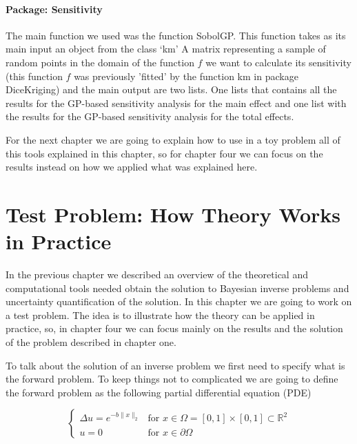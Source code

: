\documentclass[12pt]{book}
\begin{document}
\subsubsection{Package: Sensitivity}
The main function we used was the function SobolGP. This function takes as its main   input an object 
from the class `km' A matrix representing a sample of random points in the domain of the function $f$
we want to calculate its sensitivity (this function $f$ was previously 'fitted' by the function
km in package DiceKriging) and the main output are two lists. One lists that contains 
all the results for the GP-based sensitivity analysis for the main effect and one list with the 
results for the GP-based sensitivity analysis for the total effects.

 

For the next chapter we are going to explain how to use in a toy problem all of this tools explained in this 
chapter, so for chapter four we can focus on the results instead on how we applied what was explained here. 



\chapter{Test Problem: How Theory Works in Practice}

In the previous chapter we described an overview of the theoretical and computational tools needed obtain
the solution to Bayesian inverse problems and uncertainty quantification of the solution. In this chapter
we are going to work on a test problem. The idea is to illustrate how the theory can be applied in practice, so,
in chapter four we can focus mainly on the results and the  solution of the problem described in chapter one.




To talk about the solution of an inverse problem we first need to specify what is the forward problem. 
To keep things not to complicated we are going to define the forward problem as the following
partial differential equation (PDE)

\begin{equation}\label{eqntoyproblem}
\left\{
	\begin{array}{ll}
		\Delta u=e^{-b\|x\|_{2}} &\mbox{for } x\in\Omega=[0,1]\times [0,1]\subset\mathbb{R}^{2} \\
		u=0 & \mbox{for } x\in\partial\Omega
	\end{array}
\right.
\end{equation} 
\end{document}
